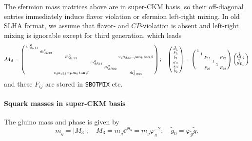 \documentclass[CheatSheet]{subfiles}
\begin{document}
The sfermion mass matrices above are in super-CKM basis, so their off-diagonal entries immediately induce flavor violation or sfermion left-right mixing.
In old SLHA format, we assume that flavor- and $CP$-violation is absent and left-right mixing is ignorable except for third generation, which leads
\begin{equation}
 \mathcal M_d= \left(\begin{smallmatrix}
  \tilde m^2_{dL11} & & & & &\\
  & \tilde m^2_{dL22} & & & &\\
  & & \tilde m^2_{dL33} & & & v_d a_{d33}-\mu m_b\tan\beta\\
  & & & \tilde m^2_{dR11} & &\\
  & & & & \tilde m^2_{dR22} &\\
  & & v_da_{d33}-\mu m_b\tan\beta&& & \tilde m^2_{dR33}
\end{smallmatrix}\right);\quad
\left(\begin{smallmatrix}
\tilde d\w L\\\tilde s\w L \\\tilde b_1\\\tilde d\w R\\\tilde s\w R \\\tilde b_2
\end{smallmatrix}\right)
=
\left(\begin{smallmatrix}
1&&&&&\\&1&&&&\\
&&F_{11}&&&F_{12}\\
&&&1&&\\&&&&1&\\
&&F_{21}&&&F_{22}\\
\end{smallmatrix}\right)
\pmat{\tilde d_{\mathrm Lj}\\\tilde d_{\mathrm Rj}}
\end{equation}
and these $F_{ij}$ are stored in \texttt{SBOTMIX} etc.

\paragraph{Squark masses in super-CKM basis}
The gluino mass and phase is given by
\begin{equation}
 m_{\tilde g} = |M_3|;
 \quad
 M_3=m_{\tilde g}\ee^{\ii\theta_3} = m_{\tilde g}\varphi_{\tilde g}^{-2};\quad
 \tilde g_0 = \varphi_{\tilde g}\tilde g.
\end{equation}
\end{document}
